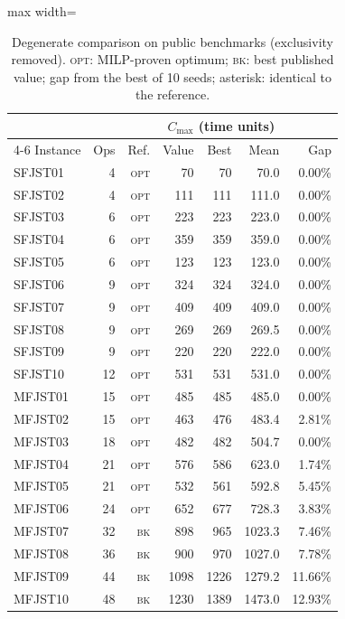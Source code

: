 \documentclass[preprint,review,12pt,authoryear]{elsarticle}
\newcommand{\NSeeds}{10}
\begin{document}
\begin{table}[!htbp]
\caption{Degenerate comparison on public benchmarks (exclusivity removed). \textsc{opt}: MILP-proven optimum; \textsc{bk}: best published value; gap from the best of \NSeeds{} seeds; asterisk: identical to the reference.}
\label{tab:external}
\centering
\small
\begin{adjustbox}{max width=\linewidth}\begin{tabular}{lrrrrrr}
\toprule
& & & \multicolumn{3}{c}{$C_{\max}$ (time units)} & \\
\cmidrule(lr){4-6}
Instance & Ops & Ref. & \multicolumn{1}{c}{Value} & Best & Mean & Gap \\
\midrule
SFJST01 & 4 & \textsc{opt} & 70 & 70\rlap{$^*$} & 70.0 & 0.00\% \\
SFJST02 & 4 & \textsc{opt} & 111 & 111\rlap{$^*$} & 111.0 & 0.00\% \\
SFJST03 & 6 & \textsc{opt} & 223 & 223\rlap{$^*$} & 223.0 & 0.00\% \\
SFJST04 & 6 & \textsc{opt} & 359 & 359\rlap{$^*$} & 359.0 & 0.00\% \\
SFJST05 & 6 & \textsc{opt} & 123 & 123\rlap{$^*$} & 123.0 & 0.00\% \\
SFJST06 & 9 & \textsc{opt} & 324 & 324\rlap{$^*$} & 324.0 & 0.00\% \\
SFJST07 & 9 & \textsc{opt} & 409 & 409\rlap{$^*$} & 409.0 & 0.00\% \\
SFJST08 & 9 & \textsc{opt} & 269 & 269\rlap{$^*$} & 269.5 & 0.00\% \\
SFJST09 & 9 & \textsc{opt} & 220 & 220\rlap{$^*$} & 222.0 & 0.00\% \\
SFJST10 & 12 & \textsc{opt} & 531 & 531\rlap{$^*$} & 531.0 & 0.00\% \\
MFJST01 & 15 & \textsc{opt} & 485 & 485\rlap{$^*$} & 485.0 & 0.00\% \\
MFJST02 & 15 & \textsc{opt} & 463 & 476 & 483.4 & 2.81\% \\
MFJST03 & 18 & \textsc{opt} & 482 & 482\rlap{$^*$} & 504.7 & 0.00\% \\
MFJST04 & 21 & \textsc{opt} & 576 & 586 & 623.0 & 1.74\% \\
MFJST05 & 21 & \textsc{opt} & 532 & 561 & 592.8 & 5.45\% \\
MFJST06 & 24 & \textsc{opt} & 652 & 677 & 728.3 & 3.83\% \\
MFJST07 & 32 & \textsc{bk} & 898 & 965 & 1023.3 & 7.46\% \\
MFJST08 & 36 & \textsc{bk} & 900 & 970 & 1027.0 & 7.78\% \\
MFJST09 & 44 & \textsc{bk} & 1098 & 1226 & 1279.2 & 11.66\% \\
MFJST10 & 48 & \textsc{bk} & 1230 & 1389 & 1473.0 & 12.93\% \\
\bottomrule
\end{tabular}\end{adjustbox}
\end{table}
\end{document}

